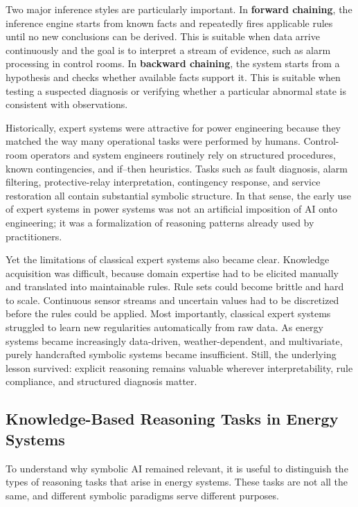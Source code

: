 Two major inference styles are particularly important. In \textbf{forward chaining}, the inference engine starts from known facts and repeatedly fires applicable rules until no new conclusions can be derived. This is suitable when data arrive continuously and the goal is to interpret a stream of evidence, such as alarm processing in control rooms. In \textbf{backward chaining}, the system starts from a hypothesis and checks whether available facts support it. This is suitable when testing a suspected diagnosis or verifying whether a particular abnormal state is consistent with observations.

Historically, expert systems were attractive for power engineering because they matched the way many operational tasks were performed by humans. Control-room operators and system engineers routinely rely on structured procedures, known contingencies, and if--then heuristics. Tasks such as fault diagnosis, alarm filtering, protective-relay interpretation, contingency response, and service restoration all contain substantial symbolic structure. In that sense, the early use of expert systems in power systems was not an artificial imposition of AI onto engineering; it was a formalization of reasoning patterns already used by practitioners.

Yet the limitations of classical expert systems also became clear. Knowledge acquisition was difficult, because domain expertise had to be elicited manually and translated into maintainable rules. Rule sets could become brittle and hard to scale. Continuous sensor streams and uncertain values had to be discretized before the rules could be applied. Most importantly, classical expert systems struggled to learn new regularities automatically from raw data. As energy systems became increasingly data-driven, weather-dependent, and multivariate, purely handcrafted symbolic systems became insufficient. Still, the underlying lesson survived: explicit reasoning remains valuable wherever interpretability, rule compliance, and structured diagnosis matter.

\subsection{Knowledge-Based Reasoning Tasks in Energy Systems}

To understand why symbolic AI remained relevant, it is useful to distinguish the types of reasoning tasks that arise in energy systems. These tasks are not all the same, and different symbolic paradigms serve different purposes.

